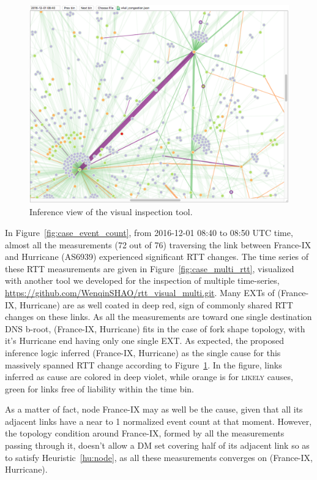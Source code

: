 \begin{figure}[!htb]
\centering
\includegraphics[width=1\textwidth]{gfx/chap5/case_infer_res.png}
\caption{Inference view of the visual inspection tool.}
\label{fig:case_infer_res}
\end{figure}

In Figure~\ref{fig:case_event_count}, from 2016-12-01 08:40 to 08:50 UTC time, almost all the measurements (72 out of 76) traversing the link between France-IX and Hurricane (AS6939) experienced significant RTT changes.
The time series of these RTT measurements are given in Figure~\ref{fig:case_multi_rtt}, visualized with another tool we developed for the inspection of multiple time-series, \url{https://github.com/WenqinSHAO/rtt_visual_multi.git}. Many \acp{EXT} of (France-IX, Hurricane) are as well coated in deep red, sign of commonly shared RTT changes on these links. As all the measurements are toward one single destination DNS b-root, 
(France-IX, Hurricane) fits in the case of fork shape topology, with it's Hurricane end having only one single \ac{EXT}. As expected, the proposed inference logic inferred (France-IX, Hurricane) as the single cause for this massively spanned RTT change according to Figure~\ref{fig:case_infer_res}. In the figure, links inferred as cause are colored in deep violet, while orange is for \textsc{likely} causes, green for links free of liability within the time bin.

As a matter of fact, node France-IX may as well be the cause, given that all its adjacent links have a near to 1 normalized event count at that moment. However, the topology condition around France-IX, formed by all the measurements passing through it, doesn't allow a \ac{DM} set covering half of its adjacent link so as to satisfy Heuristic~\ref{hu:node}, as all these measurements converges on (France-IX, Hurricane).

